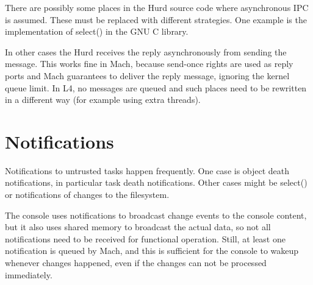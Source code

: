 There are possibly some places in the Hurd source code where
asynchronous IPC is assumed.  These must be replaced with different
strategies.  One example is the implementation of select() in the GNU
C library.

\begin{comment}
  A naive implementation would use one thread per capability to select
  on.  A better one would combine all capabilities implemented by the
  same server in one array and use one thread per server.
  
  A more complex scheme might let the server process select() calls
  asynchronously and report the result back via notifications.
\end{comment}

In other cases the Hurd receives the reply asynchronously from sending
the message.  This works fine in Mach, because send-once rights are
used as reply ports and Mach guarantees to deliver the reply message,
ignoring the kernel queue limit.  In L4, no messages are queued and
such places need to be rewritten in a different way (for example using
extra threads).

\begin{comment}
  What happens if a client does not go into the receive phase after a
  send, but instead does another send, and another one, quickly many
  sends, as fast as possible?  A carelessly written server might
  create worker threads for each request.  Instead, the server should
  probably reject to accept a request from a client thread that
  already has a pending request, so the number of worker threads is
  limited to the number of client threads.
  
  This also makes interrupting an RPC operation easier (the client
  thread ID can be used to identify the request to interrupt).
\end{comment}


\section{Notifications}

Notifications to untrusted tasks happen frequently.  One case is
object death notifications, in particular task death notifications.
Other cases might be select() or notifications of changes to the
filesystem.

The console uses notifications to broadcast change events to the
console content, but it also uses shared memory to broadcast the
actual data, so not all notifications need to be received for
functional operation.  Still, at least one notification is queued by
Mach, and this is sufficient for the console to wakeup whenever
changes happened, even if the changes can not be processed
immediately.
  
